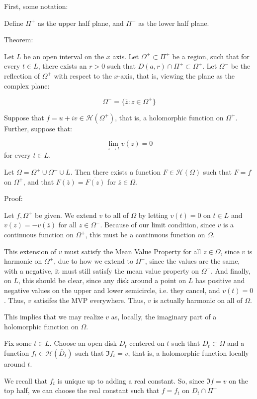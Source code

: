 \documentclass[10pt]{article}
\begin{document}
First, some notation:

Define $\Pi^+$ as the upper half plane, and $\Pi^-$ as the lower half plane.

Theorem:

Let $L$ be an open interval on the $x$ axis. Let $\Omega^+ \subset \Pi^+$ be a region, such that for every $t \in L$, there exists an $r > 0$ such that $D(a,r) \cap \Pi^+ \subset \Omega^+$. Let $\Omega^-$ be the reflection of $\Omega^+$ with respect to the $x$-axis, that is, viewing the plane as the complex plane:

$$ \Omega^- = \{ \overline{z} : z \in \Omega^+ \} $$

Suppose that $f = u + i v \in \mathcal{H}(\Omega^+)$, that is, a holomorphic function on $\Omega^+$. Further, suppose that:

$$ \lim_{z \to t} v(z) = 0 $$ for every $t \in L$. 

Let $\Omega = \Omega^+ \cup \Omega^- \cup L$. Then there exists a function $F \in \mathcal{H}(\Omega)$ such that $F = f$ on $\Omega^+$, and that $F(\overline{z}) = \overline{F(z)}$ for $\overline{z} \in \Omega$. 

Proof:

Let $f, \Omega^+$ be given. We extend $v$ to all of $\Omega$ by letting $v(t) = 0$ on $t \in L$ and $v(z) = -v(\overline{z})$ for all $z \in \Omega^-$. Because of our limit condition, since $v$ is a continuous function on $\Omega^+$, this must be a continuous function on $\Omega$.

This extension of $v$ must satisfy the Mean Value Property for all $z \in \Omega$, since $v$ is harmonic on $\Omega^+$, due to how we extend to $\Omega^-$, since the values are the same, with a negative, it must still satisfy the mean value property on $\Omega^-$. And finally, on $L$, this should be clear, since any disk around a point on $L$ has positive and negative values on the upper and lower semicircle, i.e. they cancel, and $v(t) = 0$. Thus, $v$ satisifes the MVP everywhere. Thus, $v$ is actually harmonic on all of $\Omega$.

This implies that we may realize $v$ as, locally, the imaginary part of a holomorphic function on $\Omega$.

Fix some $t \in L$. Choose an open disk $D_t$ centered on $t$ such that $\overline{D}_t \subset \Omega$ and a function $f_t \in \mathcal{H}(\overline{D}_t)$ such that $\Im f_t = v$, that is, a holomorphic function locally around $t$.

We recall that $f_t$ is unique up to adding a real constant. So, since $\Im f = v$ on the top half, we can choose the real constant such that $f = f_t$ on $D_t \cap \Pi^+$
\end{document}
